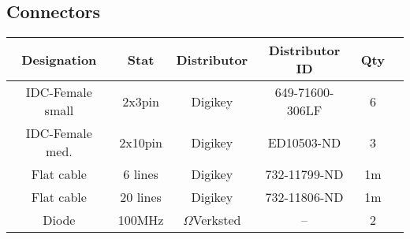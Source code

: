 \subsection{Connectors}
\begin{tabular}{c|c|c|c|c|r}
    Designation & Stat & Distributor & Distributor ID & Qty \\ \hline
    IDC-Female small & 2x3pin & Digikey & 649-71600-306LF & 6\\
    IDC-Female med. & 2x10pin & Digikey & ED10503-ND & 3\\
    Flat cable & 6 lines & Digikey & 732-11799-ND & 1m\\
    Flat cable & 20 lines & Digikey & 732-11806-ND & 1m \\
    Diode & 100MHz & $\Omega$Verksted & -- & 2\\
\end{tabular}


